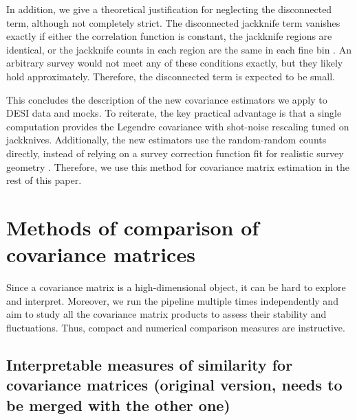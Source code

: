 In addition, we give a theoretical justification for neglecting the disconnected term, although not completely strict.
The disconnected jackknife term vanishes exactly if either the correlation function is constant, the jackknife regions are identical, or the jackknife counts in each region are the same in each fine bin \citep{rascalC}.
An arbitrary survey would not meet any of these conditions exactly, but they likely hold approximately.
Therefore, the disconnected term is expected to be small.

This concludes the description of the new covariance estimators we apply to DESI data and mocks.
To reiterate, the key practical advantage is that a single computation provides the Legendre covariance with shot-noise rescaling tuned on jackknives.
Additionally, the new estimators use the random-random counts directly, instead of relying on a survey correction function fit for realistic survey geometry \citep{rascalC-legendre-3}.
Therefore, we use this method for covariance matrix estimation in the rest of this paper.

\section{Methods of comparison of covariance matrices}
\label{sec:cov-comparison}

Since a covariance matrix is a high-dimensional object, it can be hard to explore and interpret.
Moreover, we run the pipeline multiple times independently and aim to study all the covariance matrix products to assess their stability and fluctuations.
Thus, compact and numerical comparison measures are instructive.

\subsection{Interpretable measures of similarity for covariance matrices (original version, needs to be merged with the other one)}
\label{subsec:comparison-measures}

